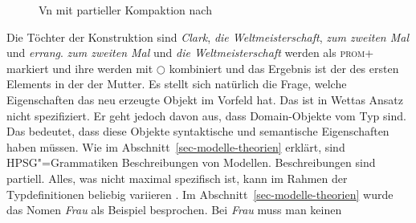 \begin{exe}
\begin{xlist}
\begin{figure}
\caption{Vn mit partieller Kompaktion nach \citet[]{Wetta2011a}}\label{fig-v3-wetta2011}
\end{figure}
Die Töchter der Konstruktion sind \emph{Clark}, \emph{die Weltmeisterschaft}, \emph{zum zweiten Mal}
und \emph{errang}. \emph{zum zweiten Mal} und \emph{die Weltmeisterschaft} werden als \textsc{prom}+
markiert und ihre \domwe werden mit $\bigcirc$ kombiniert und das Ergebnis ist der \domw des ersten
Elements in der \doml der Mutter. Es stellt sich natürlich die Frage, welche Eigenschaften das neu
erzeugte Objekt im Vorfeld hat. Das ist in Wettas Ansatz nicht spezifiziert. Er geht jedoch davon
aus, dass Domain-Objekte vom Typ  sind. Das bedeutet, dass diese Objekte syntaktische und
semantische Eigenschaften haben müssen. Wie im Abschnitt~\ref{sec-modelle-theorien} erklärt, sind
HPSG"=Grammatiken Beschreibungen von Modellen. Beschreibungen sind partiell. Alles, was nicht
maximal spezifisch ist, kann im Rahmen der Typdefinitionen beliebig variieren \citep{King99a-u,Richter2024a}. Im
Abschnitt~\ref{sec-modelle-theorien} wurde das Nomen \emph{Frau} als Beispiel besprochen. Bei \emph{Frau} muss man keinen

\end{xlist}
\end{exe}
